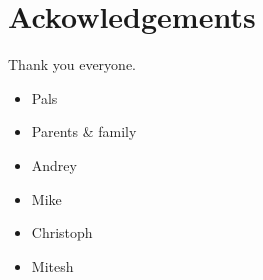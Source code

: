 \clearpage
\chapter*{\centering Ackowledgements}
Thank you everyone.
\begin{itemize}
  \item Pals
  \item Parents \& family
  \item Andrey
  \item Mike
  \item Christoph
  \item Mitesh
\end{itemize}
